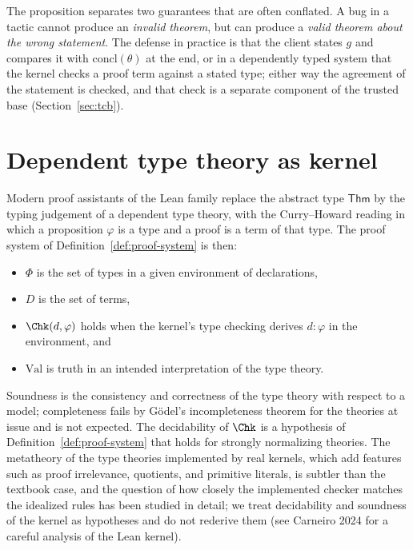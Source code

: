 The proposition separates two guarantees that are often conflated. A bug in a tactic cannot produce an \emph{invalid theorem}, but can produce a \emph{valid theorem about the wrong statement}. The defense in practice is that the client states $g$ and compares it with $\mathrm{concl}(\theta)$ at the end, or in a dependently typed system that the kernel checks a proof term against a stated type; either way the agreement of the statement is checked, and that check is a separate component of the trusted base (Section~\ref{sec:tcb}).

\section{Dependent type theory as kernel}
\label{sec:dtt}

Modern proof assistants of the Lean family replace the abstract type $\mathsf{Thm}$ by the typing judgement of a dependent type theory, with the Curry--Howard reading in which a proposition $\varphi$ is a type and a proof is a term of that type. The proof system of Definition~\ref{def:proof-system} is then:
\begin{itemize}[nosep]
\item $\Phi$ is the set of types in a given environment of declarations,
\item $D$ is the set of terms,
\item $\Chk(d,\varphi)$ holds when the kernel's type checking derives $d:\varphi$ in the environment, and
\item $\mathrm{Val}$ is truth in an intended interpretation of the type theory.
\end{itemize}
Soundness is the consistency and correctness of the type theory with respect to a model; completeness fails by G\"odel's incompleteness theorem for the theories at issue and is not expected. The decidability of $\Chk$ is a hypothesis of Definition~\ref{def:proof-system} that holds for strongly normalizing theories. The metatheory of the type theories implemented by real kernels, which add features such as proof irrelevance, quotients, and primitive literals, is subtler than the textbook case, and the question of how closely the implemented checker matches the idealized rules has been studied in detail; we treat decidability and soundness of the kernel as hypotheses and do not rederive them (see Carneiro 2024 for a careful analysis of the Lean kernel).

